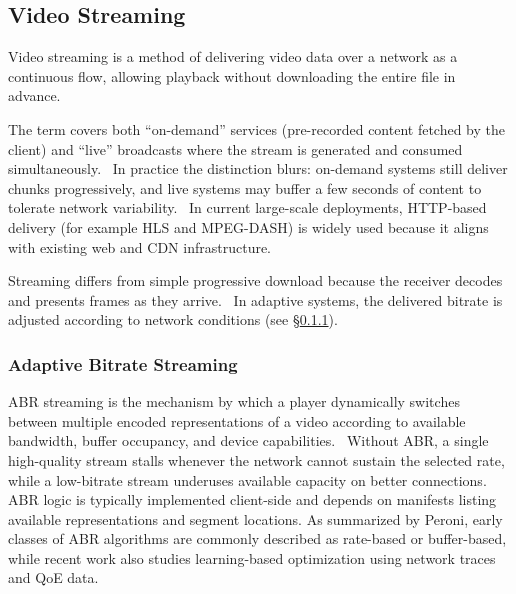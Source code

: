 \subsection{Video Streaming}
Video streaming is a method of delivering video data over a network as a continuous flow, allowing playback without downloading the entire file in advance.~\cite{apostolopoulosVideoStreamingConcepts,peroniEndtoEndPipelinePerspective2025}

The term covers both ``on-demand'' services (pre-recorded content fetched by the client) and ``live'' broadcasts where the stream is generated and consumed simultaneously.~\cite{peroniEndtoEndPipelinePerspective2025} In practice the distinction blurs: on-demand systems still deliver chunks progressively, and live systems may buffer a few seconds of content to tolerate network variability.~\cite{peroniEndtoEndPipelinePerspective2025} In current large-scale deployments, HTTP-based delivery (for example HLS and MPEG-DASH) is widely used because it aligns with existing web and \ac{CDN} infrastructure.~\cite{pantos_http_2017,noauthor_standards_nodate}

Streaming differs from simple progressive download because the receiver decodes and presents frames as they arrive.~\cite{apostolopoulosVideoStreamingConcepts} In adaptive systems, the delivered bitrate is adjusted according to network conditions (see \S\ref{sec:abr}).~\cite{peroniEndtoEndPipelinePerspective2025}

\subsubsection{Adaptive Bitrate Streaming}
\label{sec:abr}
\ac{ABR} streaming is the mechanism by which a player dynamically switches between multiple encoded representations of a video according to available bandwidth, buffer occupancy, and device capabilities.~\cite{peroniEndtoEndPipelinePerspective2025} Without \ac{ABR}, a single high-quality stream stalls whenever the network cannot sustain the selected rate, while a low-bitrate stream underuses available capacity on better connections. \ac{ABR} logic is typically implemented client-side and depends on manifests listing available representations and segment locations. As summarized by Peroni, early classes of \ac{ABR} algorithms are commonly described as rate-based or buffer-based, while recent work also studies learning-based optimization using network traces and \ac{QoE} data.~\cite{peroniEndtoEndPipelinePerspective2025}

